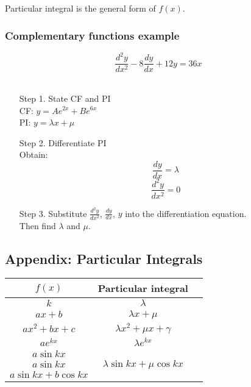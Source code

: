 \documentclass[a4paper,9pt]{scrartcl}
\begin{document}
    Particular integral is the general form of $f(x)$. \\

    \subsubsection{Complementary functions example}

    \begin{displaymath}
        \frac{d^{2}y}{dx^2} -8\frac{dy}{dx} + 12y = 36x
    \end{displaymath} \\
    \begin{itemize}
        \item [Step 1.] State CF and PI\\
        CF: $y = Ae^{2x}+Be^{6x}$\\
        PI: $y = {\lambda}x + \mu$\\

        \item [Step 2.] Differentiate PI\\
        Obtain: \\
        \begin{displaymath}
            \frac{dy}{dx} = \lambda
        \end{displaymath}
        \begin{displaymath}
            \frac{d^{2}y}{dx^2} = 0
        \end{displaymath}

        \item [Step 3.] Substitute $\frac{d^{2}y}{dx^2}$, $\frac{dy}{dx}$, $y$ into the differentiation equation.\\
        Then find $\lambda$ and $\mu$.
    \end{itemize}

    \subsection{Appendix: Particular Integrals}
    \begin{tabular}{|c|c|c|}
        \hline $f(x)$         & Particular integral                                  \\
        \hline $k$            & $\lambda$                                            \\
        \hline $ax+b$         & ${\lambda}x+\mu$                                     \\
        \hline $ax^2+bx+c$    & ${\lambda}x^2+{\mu}x+\gamma$                         \\
        \hline $ae^{kx}$      & ${\lambda}e^{kx}$                                    \\
        \hline $a\sin{kx}$    & \multirow{3}{*}{${\lambda}\sin{kx}+{\mu}{\cos{kx}}$} \\
        $a\sin{kx}$           &                                                      \\
        $a\sin{kx}+b\cos{kx}$ &                                                      \\
        \hline
    \end{tabular}
\end{document}
